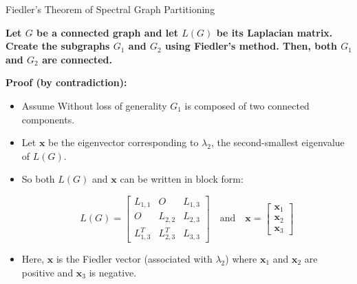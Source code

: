 \documentclass[aspectratio=169]{beamer}
\begin{document}
\begin{frame}{Fiedler's Theorem of Spectral Graph Partitioning}


\textbf{Let \( G \) be a connected graph and let \( L(G) \) be its Laplacian matrix. Create the subgraphs \( G_1 \) and \( G_2 \) using Fiedler's method. Then, both \( G_1 \) and \( G_2 \) are connected.}

\textbf{Proof (by contradiction):}
  \begin{itemize}
    \item Assume Without loss of generality \( G_1 \) is composed of two connected components.
    \item Let \( \mathbf{x} \) be the eigenvector corresponding to \( \lambda_2 \), the second-smallest eigenvalue of \( L(G) \).
    \item So both \( L(G) \) and \( \mathbf{x} \) can be written in block form:


  \[
  L(G) = 
  \begin{bmatrix}
  L_{1,1} & O & L_{1,3} \\
  O & L_{2,2} & L_{2,3} \\
  L_{1,3}^T & L_{2,3}^T & L_{3,3}
  \end{bmatrix}
  \quad \text{and} \quad
  \mathbf{x} =
  \begin{bmatrix}
  \mathbf{x}_1 \\
  \mathbf{x}_2 \\
  \mathbf{x}_3
  \end{bmatrix}
  \]

  \item Here, \( \mathbf{x} \) is the Fiedler vector (associated with \( \lambda_2 \)) where \( \mathbf{x}_1 \) and \( \mathbf{x}_2 \) are positive and \( \mathbf{x}_3 \) is negative.
\end{itemize}

\end{frame}
\end{document}
